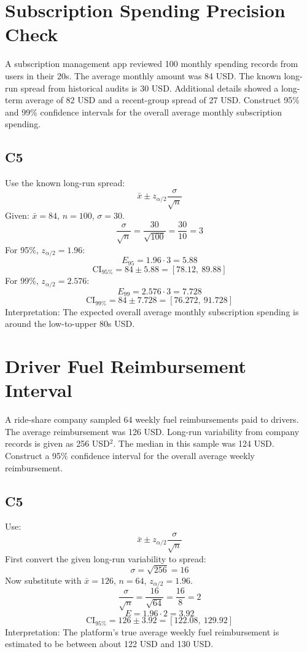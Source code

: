 \begin{ExamProblems}
		\newpage
		\item
		\section{Subscription Spending Precision Check}
		A subscription management app reviewed 100 monthly spending records from users in their 20s.
		The average monthly amount was 84 USD.
		The known long-run spread from historical audits is 30 USD.
		Additional details showed a long-term average of 82 USD and a recent-group spread of 27 USD.
		Construct 95\% and 99\% confidence intervals for the overall average monthly subscription spending.

		\subsection*{C5}
		Use the known long-run spread:
		\[
		\bar{x} \pm z_{\alpha/2}\frac{\sigma}{\sqrt{n}}
		\]
		Given: $\bar{x}=84$, $n=100$, $\sigma=30$.
		\[
		\frac{\sigma}{\sqrt{n}}=\frac{30}{\sqrt{100}}=\frac{30}{10}=3
		\]
		For 95\%, $z_{\alpha/2}=1.96$:
		\[
		E_{95}=1.96\cdot 3=5.88
		\]
		\[
		\text{CI}_{95\%}=84\pm 5.88=[78.12,\ 89.88]
		\]
		For 99\%, $z_{\alpha/2}=2.576$:
		\[
		E_{99}=2.576\cdot 3=7.728
		\]
		\[
		\text{CI}_{99\%}=84\pm 7.728=[76.272,\ 91.728]
		\]
		Interpretation: The expected overall average monthly subscription spending is around the low-to-upper 80s USD.

		\newpage
		\item
		\section{Driver Fuel Reimbursement Interval}
		A ride-share company sampled 64 weekly fuel reimbursements paid to drivers.
		The average reimbursement was 126 USD.
		Long-run variability from company records is given as 256 USD$^2$.
		The median in this sample was 124 USD.
		Construct a 95\% confidence interval for the overall average weekly reimbursement.

		\subsection*{C5}
		Use:
		\[
		\bar{x} \pm z_{\alpha/2}\frac{\sigma}{\sqrt{n}}
		\]
		First convert the given long-run variability to spread:
		\[
		\sigma=\sqrt{256}=16
		\]
		Now substitute with $\bar{x}=126$, $n=64$, $z_{\alpha/2}=1.96$.
		\[
		\frac{\sigma}{\sqrt{n}}=\frac{16}{\sqrt{64}}=\frac{16}{8}=2
		\]
		\[
		E=1.96\cdot 2=3.92
		\]
		\[
		\text{CI}_{95\%}=126\pm 3.92=[122.08,\ 129.92]
		\]
		Interpretation: The platform's true average weekly fuel reimbursement is estimated to be between about 122 USD and 130 USD.


\end{ExamProblems}
